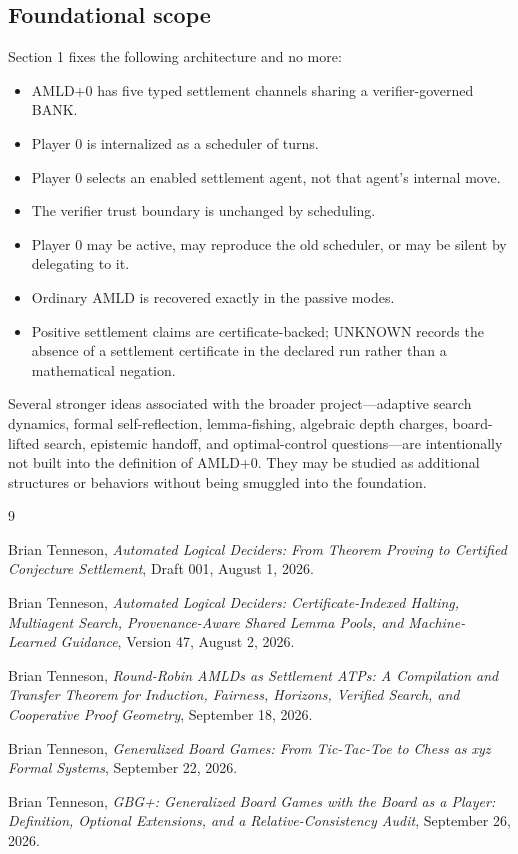 \documentclass[11pt]{article}
\begin{document}
\subsection{Foundational scope}

Section 1 fixes the following architecture and no more:
\begin{itemize}
    \item AMLD+0 has five typed settlement channels sharing a verifier-governed BANK.
    \item Player 0 is internalized as a scheduler of turns.
    \item Player 0 selects an enabled settlement agent, not that agent's internal move.
    \item The verifier trust boundary is unchanged by scheduling.
    \item Player 0 may be active, may reproduce the old scheduler, or may be silent by delegating to it.
    \item Ordinary AMLD is recovered exactly in the passive modes.
    \item Positive settlement claims are certificate-backed; UNKNOWN records the absence of a settlement certificate in the declared run rather than a mathematical negation.
\end{itemize}

Several stronger ideas associated with the broader project---adaptive search dynamics, formal self-reflection, lemma-fishing, algebraic depth charges, board-lifted search, epistemic handoff, and optimal-control questions---are intentionally not built into the definition of AMLD+0. They may be studied as additional structures or behaviors without being smuggled into the foundation.

\begingroup
\small
\setlength{\parskip}{0pt}
\begin{thebibliography}{9}

Brian Tenneson,
\emph{Automated Logical Deciders: From Theorem Proving to Certified Conjecture Settlement},
Draft 001, August 1, 2026.

Brian Tenneson,
\emph{Automated Logical Deciders: Certificate-Indexed Halting, Multiagent Search, Provenance-Aware Shared Lemma Pools, and Machine-Learned Guidance},
Version 47, August 2, 2026.

Brian Tenneson,
\emph{Round-Robin AMLDs as Settlement ATPs: A Compilation and Transfer Theorem for Induction, Fairness, Horizons, Verified Search, and Cooperative Proof Geometry},
September 18, 2026.

Brian Tenneson,
\emph{Generalized Board Games: From Tic-Tac-Toe to Chess as xyz Formal Systems},
September 22, 2026.

Brian Tenneson,
\emph{GBG+: Generalized Board Games with the Board as a Player: Definition, Optional Extensions, and a Relative-Consistency Audit},
September 26, 2026.

\end{thebibliography}
\endgroup
\end{document}

